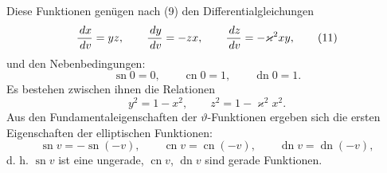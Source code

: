 \documentclass[11pt]{article}
\providecommand{\dd}{\,d}
\providecommand{\sn}{\operatorname{sn}}
\providecommand{\cn}{\operatorname{cn}}
\providecommand{\dn}{\operatorname{dn}}
\begin{document}
Diese Funktionen genügen nach (9) den Differentialgleichungen
\begin{equation}
{\dd x\over\dd v}=yz,
\qquad
{\dd y\over\dd v}=-zx,
\qquad
{\dd z\over\dd v}=-\varkappa^2xy,
\tag{11}
\end{equation}
und den Nebenbedingungen:
\begin{equation}
\sn0=0,
\qquad \cn0=1,
\qquad \dn0=1.
\tag{12}
\end{equation}
Es bestehen zwischen ihnen die Relationen
\begin{equation}
y^2=1-x^2,
\qquad
z^2=1-\varkappa^2x^2.
\tag{13}
\end{equation}
Aus den Fundamentaleigenschaften der $\vartheta$-Funktionen ergeben sich die ersten Eigenschaften der elliptischen Funktionen:
\[
\sn v=-\sn(-v),
\qquad
\cn v=\cn(-v),
\qquad
\dn v=\dn(-v),
\]
d. h. $\sn v$ ist eine ungerade, $\cn v$, $\dn v$ sind gerade Funktionen.
\end{document}
